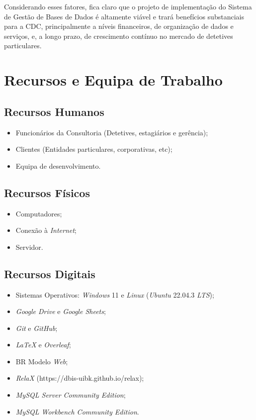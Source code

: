 \documentclass[a4paper,12pt]{scrreprt}
\begin{document}
        Considerando esses fatores, fica claro que o projeto de implementação do Sistema de Gestão de Bases de Dados é
        altamente viável e trará benefícios substanciais para a CDC, principalmente a níveis financeiros, de
        organização de dados e serviços, e, a longo prazo, de crescimento contínuo no mercado de detetives particulares.

    \clearpage
    
    \section{Recursos e Equipa de Trabalho}
        \subsection{Recursos Humanos}
            \begin{itemize}
                \item Funcionários da Consultoria (Detetives, estagiários e gerência);
                \item Clientes (Entidades particulares, corporativas, etc);
                \item Equipa de desenvolvimento.
            \end{itemize}
        \subsection{Recursos Físicos}
            \begin{itemize}
                \item Computadores;
                \item Conexão à \textit{Internet};
                \item Servidor.
            \end{itemize}
        \subsection{Recursos Digitais}
            \begin{itemize}
                \item Sistemas Operativos: \textit{Windows} 11 e \textit{Linux} (\textit{Ubuntu} 22.04.3 \textit{LTS});
                \item \textit{Google Drive} e \textit{Google Sheets};
                \item \textit{Git} e \textit{GitHub};
                \item \textit{LaTeX} e \textit{Overleaf};
                \item BR Modelo \textit{Web};
                \item \textit{RelaX} (https://dbis-uibk.github.io/relax);
                \item \textit{MySQL Server Community Edition};
                \item \textit{MySQL Workbench Community Edition}.
            \end{itemize}
\end{document}
